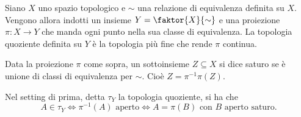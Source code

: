 \begin{defn}
    Siano $X$ uno spazio topologico e $\sim$ una relazione di equivalenza
    definita su $X$. Vengono allora indotti un insieme $Y = \faktor{X}{\sim}$ e
    una proiezione $\pi\colon X\longrightarrow Y$ che manda ogni punto nella sua
    classe di equivalenza. La topologia quoziente definita su $Y$ \`e la
    topologia pi\`u fine che rende $\pi$ continua.
\end{defn}

\begin{defn}
    Data la proiezione $\pi$ come sopra, un sottoinsieme $Z \subseteq X$ si dice
    saturo se \`e unione di classi di equivalenza per $\sim$. Cio\`e ${Z =
    \pi^{-1}\pi(Z)}$.
\end{defn}

\begin{oss}
    Nel setting di prima, detta $\tau_Y$ la topologia quoziente, si ha che
    \[
    A\in \tau_Y \Longleftrightarrow
    \pi^{-1}(A) \text{\ aperto} \Longleftrightarrow
    A = \pi(B) \text{\ con $B$ aperto saturo}.
    \]
\end{oss}

